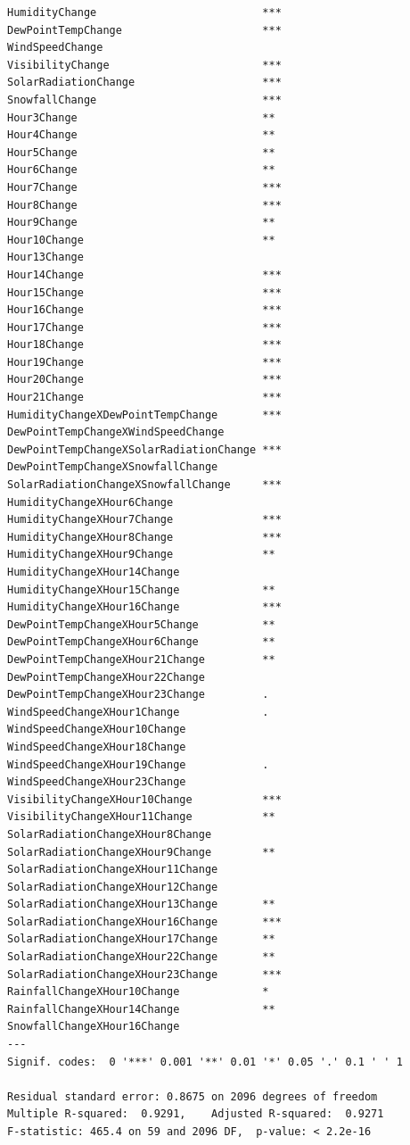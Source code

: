\documentclass[
  letterpaper,
  DIV=11,
  numbers=noendperiod]{scrartcl}
\begin{document}
\begin{verbatim}
HumidityChange                          ***
DewPointTempChange                      ***
WindSpeedChange                            
VisibilityChange                        ***
SolarRadiationChange                    ***
SnowfallChange                          ***
Hour3Change                             ** 
Hour4Change                             ** 
Hour5Change                             ** 
Hour6Change                             ** 
Hour7Change                             ***
Hour8Change                             ***
Hour9Change                             ** 
Hour10Change                            ** 
Hour13Change                               
Hour14Change                            ***
Hour15Change                            ***
Hour16Change                            ***
Hour17Change                            ***
Hour18Change                            ***
Hour19Change                            ***
Hour20Change                            ***
Hour21Change                            ***
HumidityChangeXDewPointTempChange       ***
DewPointTempChangeXWindSpeedChange         
DewPointTempChangeXSolarRadiationChange ***
DewPointTempChangeXSnowfallChange          
SolarRadiationChangeXSnowfallChange     ***
HumidityChangeXHour6Change                 
HumidityChangeXHour7Change              ***
HumidityChangeXHour8Change              ***
HumidityChangeXHour9Change              ** 
HumidityChangeXHour14Change                
HumidityChangeXHour15Change             ** 
HumidityChangeXHour16Change             ***
DewPointTempChangeXHour5Change          ** 
DewPointTempChangeXHour6Change          ** 
DewPointTempChangeXHour21Change         ** 
DewPointTempChangeXHour22Change            
DewPointTempChangeXHour23Change         .  
WindSpeedChangeXHour1Change             .  
WindSpeedChangeXHour10Change               
WindSpeedChangeXHour18Change               
WindSpeedChangeXHour19Change            .  
WindSpeedChangeXHour23Change               
VisibilityChangeXHour10Change           ***
VisibilityChangeXHour11Change           ** 
SolarRadiationChangeXHour8Change           
SolarRadiationChangeXHour9Change        ** 
SolarRadiationChangeXHour11Change          
SolarRadiationChangeXHour12Change          
SolarRadiationChangeXHour13Change       ** 
SolarRadiationChangeXHour16Change       ***
SolarRadiationChangeXHour17Change       ** 
SolarRadiationChangeXHour22Change       ** 
SolarRadiationChangeXHour23Change       ***
RainfallChangeXHour10Change             *  
RainfallChangeXHour14Change             ** 
SnowfallChangeXHour16Change                
---
Signif. codes:  0 '***' 0.001 '**' 0.01 '*' 0.05 '.' 0.1 ' ' 1

Residual standard error: 0.8675 on 2096 degrees of freedom
Multiple R-squared:  0.9291,    Adjusted R-squared:  0.9271 
F-statistic: 465.4 on 59 and 2096 DF,  p-value: < 2.2e-16
\end{verbatim}
\end{document}
